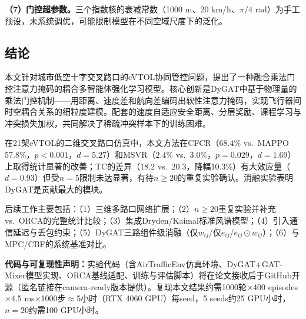 \documentclass[12pt,a4paper,UTF8]{ctexart}
\begin{document}
\textbf{（7）门控超参数。}三个指数核的衰减常数（1000 m、20 km/h、$\pi/4$ rad）为手工预设，未系统调优，可能限制模型在不同空域尺度下的泛化。

\subsection{结论}

本文针对城市低空十字交叉路口的eVTOL协同管控问题，提出了一种融合乘法门控注意力掩码的耦合多智能体强化学习模型。核心创新是DyGAT中基于物理量的乘法门控机制——用距离、速度差和航向差编码出软性注意力掩码，实现飞行器间时空耦合关系的细粒度建模。配套的速度自适应安全距离、分层奖励、课程学习与冲突损失加权，共同解决了稀疏冲突样本下的训练困难。

在21架eVTOL的二维交叉路口仿真中，本文方法在CFCR（$68.4\%$ vs.\ MAPPO $57.8\%$，$p<0.001$，$d=5.27$）和MSVR（$2.4\%$ vs.\ $3.0\%$，$p=0.029$，$d=1.69$）上取得统计显著的改善；TC的差异（$18.2$ vs.\ $20.3$，降幅10.3\%）有大效应量（$d=0.93$）但受$n=5$限制未达显著，有待$n\geq20$的重复实验确认。消融实验表明DyGAT是贡献最大的模块。

后续工作主要包括：（1）三维多路口网络扩展；（2）$n\geq20$重复实验并补充vs.\ ORCA的完整统计比较；（3）集成Dryden/Kaimal标准风谱模型；（4）引入通信延迟与丢包约束；（5）DyGAT三路组件级消融（仅$w_{ij}$/仅$e_{ij}$/$e_{ij}\odot w_{ij}$）；（6）与MPC/CBF的系统基准对比。

\textbf{代码与可复现性声明：}实验代码（含AirTrafficEnv仿真环境、DyGAT+GAT-Mixer模型实现、ORCA基线适配、训练与评估脚本）将在论文接收后于GitHub开源（匿名链接在camera-ready版本提供）。复现本文结果约需1000轮$\times$400 episodes$\times$4.5 ms$\times$1000步$\approx$5小时（RTX 4060 GPU）每seed，5 seeds约25 GPU小时，$n=20$约需100 GPU小时。
\end{document}
